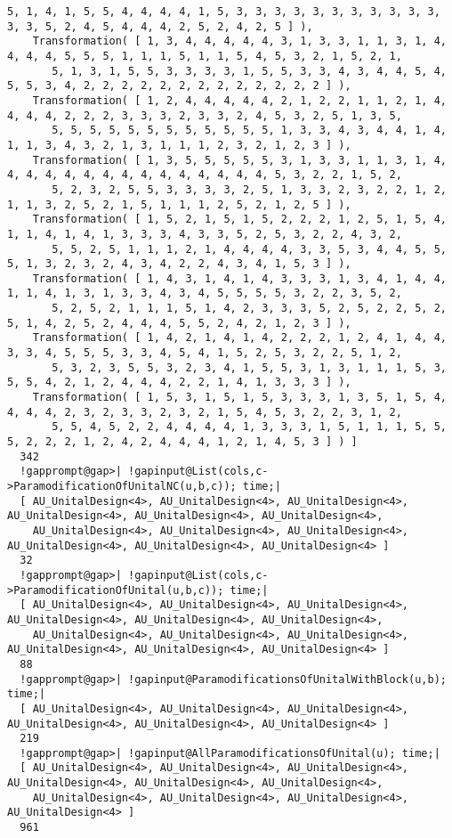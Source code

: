 \documentclass[a4paper,11pt]{report}
\begin{document}
{{\begin{Verbatim}[commandchars=!@|,fontsize=\small,frame=single,label=Example]
       5, 1, 4, 1, 5, 5, 4, 4, 4, 4, 1, 5, 3, 3, 3, 3, 3, 3, 3, 3, 3, 3, 3, 3, 3, 5, 2, 4, 5, 4, 4, 4, 2, 5, 2, 4, 2, 5 ] ), 
    Transformation( [ 1, 3, 4, 4, 4, 4, 4, 3, 1, 3, 3, 1, 1, 3, 1, 4, 4, 4, 4, 5, 5, 5, 1, 1, 1, 5, 1, 1, 5, 4, 5, 3, 2, 1, 5, 2, 1,
       5, 1, 3, 1, 5, 5, 3, 3, 3, 3, 1, 5, 5, 3, 3, 4, 3, 4, 4, 5, 4, 5, 5, 3, 4, 2, 2, 2, 2, 2, 2, 2, 2, 2, 2, 2, 2, 2 ] ), 
    Transformation( [ 1, 2, 4, 4, 4, 4, 4, 2, 1, 2, 2, 1, 1, 2, 1, 4, 4, 4, 4, 2, 2, 2, 3, 3, 3, 2, 3, 3, 2, 4, 5, 3, 2, 5, 1, 3, 5,
       5, 5, 5, 5, 5, 5, 5, 5, 5, 5, 5, 5, 1, 3, 3, 4, 3, 4, 4, 1, 4, 1, 1, 3, 4, 3, 2, 1, 3, 1, 1, 1, 2, 3, 2, 1, 2, 3 ] ), 
    Transformation( [ 1, 3, 5, 5, 5, 5, 5, 3, 1, 3, 3, 1, 1, 3, 1, 4, 4, 4, 4, 4, 4, 4, 4, 4, 4, 4, 4, 4, 4, 4, 5, 3, 2, 2, 1, 5, 2,
       5, 2, 3, 2, 5, 5, 3, 3, 3, 3, 2, 5, 1, 3, 3, 2, 3, 2, 2, 1, 2, 1, 1, 3, 2, 5, 2, 1, 5, 1, 1, 1, 2, 5, 2, 1, 2, 5 ] ), 
    Transformation( [ 1, 5, 2, 1, 5, 1, 5, 2, 2, 2, 1, 2, 5, 1, 5, 4, 1, 1, 4, 1, 4, 1, 3, 3, 3, 4, 3, 3, 5, 2, 5, 3, 2, 2, 4, 3, 2,
       5, 5, 2, 5, 1, 1, 1, 2, 1, 4, 4, 4, 4, 3, 3, 5, 3, 4, 4, 5, 5, 5, 1, 3, 2, 3, 2, 4, 3, 4, 2, 2, 4, 3, 4, 1, 5, 3 ] ), 
    Transformation( [ 1, 4, 3, 1, 4, 1, 4, 3, 3, 3, 1, 3, 4, 1, 4, 4, 1, 1, 4, 1, 3, 1, 3, 3, 4, 3, 4, 5, 5, 5, 5, 3, 2, 2, 3, 5, 2,
       5, 2, 5, 2, 1, 1, 1, 5, 1, 4, 2, 3, 3, 3, 5, 2, 5, 2, 2, 5, 2, 5, 1, 4, 2, 5, 2, 4, 4, 4, 5, 5, 2, 4, 2, 1, 2, 3 ] ), 
    Transformation( [ 1, 4, 2, 1, 4, 1, 4, 2, 2, 2, 1, 2, 4, 1, 4, 4, 3, 3, 4, 5, 5, 5, 3, 3, 4, 5, 4, 1, 5, 2, 5, 3, 2, 2, 5, 1, 2,
       5, 3, 2, 3, 5, 5, 3, 2, 3, 4, 1, 5, 5, 3, 1, 3, 1, 1, 1, 5, 3, 5, 5, 4, 2, 1, 2, 4, 4, 4, 2, 2, 1, 4, 1, 3, 3, 3 ] ), 
    Transformation( [ 1, 5, 3, 1, 5, 1, 5, 3, 3, 3, 1, 3, 5, 1, 5, 4, 4, 4, 4, 2, 3, 2, 3, 3, 2, 3, 2, 1, 5, 4, 5, 3, 2, 2, 3, 1, 2,
       5, 5, 4, 5, 2, 2, 4, 4, 4, 4, 1, 3, 3, 3, 1, 5, 1, 1, 1, 5, 5, 5, 2, 2, 2, 1, 2, 4, 2, 4, 4, 4, 1, 2, 1, 4, 5, 3 ] ) ]
  342
  !gapprompt@gap>| !gapinput@List(cols,c->ParamodificationOfUnitalNC(u,b,c)); time;|
  [ AU_UnitalDesign<4>, AU_UnitalDesign<4>, AU_UnitalDesign<4>, AU_UnitalDesign<4>, AU_UnitalDesign<4>, AU_UnitalDesign<4>, 
    AU_UnitalDesign<4>, AU_UnitalDesign<4>, AU_UnitalDesign<4>, AU_UnitalDesign<4>, AU_UnitalDesign<4>, AU_UnitalDesign<4> ]
  32
  !gapprompt@gap>| !gapinput@List(cols,c->ParamodificationOfUnital(u,b,c)); time;|
  [ AU_UnitalDesign<4>, AU_UnitalDesign<4>, AU_UnitalDesign<4>, AU_UnitalDesign<4>, AU_UnitalDesign<4>, AU_UnitalDesign<4>, 
    AU_UnitalDesign<4>, AU_UnitalDesign<4>, AU_UnitalDesign<4>, AU_UnitalDesign<4>, AU_UnitalDesign<4>, AU_UnitalDesign<4> ]
  88
  !gapprompt@gap>| !gapinput@ParamodificationsOfUnitalWithBlock(u,b); time;|
  [ AU_UnitalDesign<4>, AU_UnitalDesign<4>, AU_UnitalDesign<4>, AU_UnitalDesign<4>, AU_UnitalDesign<4>, AU_UnitalDesign<4> ]
  219
  !gapprompt@gap>| !gapinput@AllParamodificationsOfUnital(u); time;|
  [ AU_UnitalDesign<4>, AU_UnitalDesign<4>, AU_UnitalDesign<4>, AU_UnitalDesign<4>, AU_UnitalDesign<4>, AU_UnitalDesign<4>, 
    AU_UnitalDesign<4>, AU_UnitalDesign<4>, AU_UnitalDesign<4>, AU_UnitalDesign<4> ]
  961
\end{Verbatim}
 }

}
\end{document}
